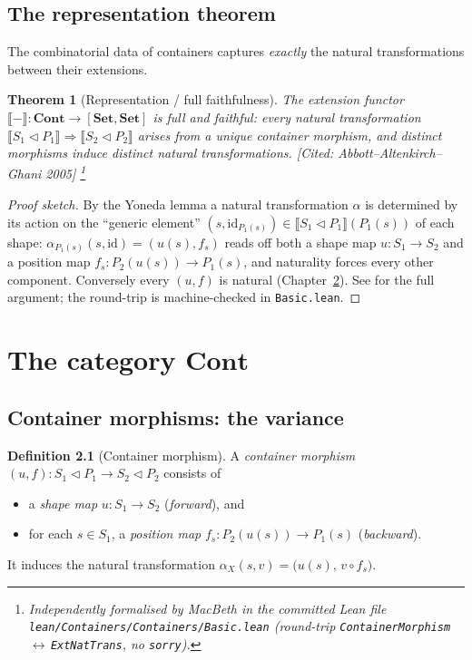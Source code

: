 \documentclass[11pt,a4paper]{book}
\newcommand{\Set}{\mathbf{Set}}
\newcommand{\Cont}{\mathbf{Cont}}
\newcommand{\cont}[2]{#1 \triangleleft #2}
\newcommand{\Ext}[1]{\llbracket #1 \rrbracket}
\newcommand{\id}{\mathrm{id}}
\theoremstyle{plain}
\newtheorem{Theorem}{Theorem}[chapter]
\theoremstyle{definition}
\newtheorem{Definition}[Theorem]{Definition}
\theoremstyle{remark}
\newcommand{\prov}[1]{\hfill\textsf{\footnotesize[#1]}}
\begin{document}
\section{The representation theorem}

The combinatorial data of containers captures \emph{exactly} the natural
transformations between their extensions.

\begin{Theorem}[Representation / full faithfulness]\label{thm:rep}
The extension functor $\Ext{-}\colon\Cont\to[\Set,\Set]$ is full and faithful:
every natural transformation $\Ext{\cont{S_1}{P_1}}\Rightarrow\Ext{\cont{S_2}{P_2}}$
arises from a unique container morphism, and distinct morphisms induce distinct
natural transformations.
\prov{Cited: Abbott--Altenkirch--Ghani 2005}%
\footnote{Independently formalised by MacBeth in the committed Lean file
\texttt{lean/Containers/Containers/Basic.lean} (round-trip
\texttt{ContainerMorphism}\,$\leftrightarrow$\,\texttt{ExtNatTrans}, no
\texttt{sorry}).}
\end{Theorem}

\begin{proof}[Proof sketch]
By the Yoneda lemma a natural transformation $\alpha$ is determined by its action
on the ``generic element'' $(s,\id_{P_1(s)})\in\Ext{\cont{S_1}{P_1}}(P_1(s))$ of
each shape: $\alpha_{P_1(s)}(s,\id)=(u(s),f_s)$ reads off both a shape map
$u\colon S_1\to S_2$ and a position map $f_s\colon P_2(u(s))\to P_1(s)$, and
naturality forces every other component. Conversely every $(u,f)$ is natural
(Chapter~\ref{ch:contcat}). See \cite{AAG05} for the full argument; the
round-trip is machine-checked in \texttt{Basic.lean}.
\end{proof}

\chapter{The category \texorpdfstring{$\Cont$}{Cont}}
\label{ch:contcat}

\section{Container morphisms: the variance}

\begin{Definition}[Container morphism]\label{def:contmor}
A \emph{container morphism} $(u,f)\colon\cont{S_1}{P_1}\to\cont{S_2}{P_2}$ consists
of
\begin{itemize}[nosep]
  \item a \emph{shape map} $u\colon S_1\to S_2$ (\emph{forward}), and
  \item for each $s\in S_1$, a \emph{position map}
        $f_s\colon P_2(u(s))\to P_1(s)$ (\emph{backward}).
\end{itemize}
It induces the natural transformation $\alpha_X(s,v)=\bigl(u(s),\, v\circ f_s\bigr)$.
\end{Definition}
\end{document}
